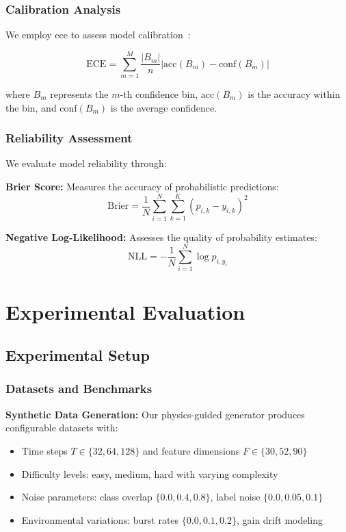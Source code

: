 \documentclass[journal]{IEEEtran}
\begin{document}
\subsubsection{Calibration Analysis}

We employ \gls{ece} to assess model calibration~\cite{calibration_guo2017}:

\begin{equation}
\text{ECE} = \sum_{m=1}^{M} \frac{|B_m|}{n} |\text{acc}(B_m) - \text{conf}(B_m)|
\end{equation}

where $B_m$ represents the $m$-th confidence bin, $\text{acc}(B_m)$ is the accuracy within the bin, and $\text{conf}(B_m)$ is the average confidence.

\subsubsection{Reliability Assessment}

We evaluate model reliability through:

\textbf{Brier Score:} Measures the accuracy of probabilistic predictions:
\begin{equation}
\text{Brier} = \frac{1}{N} \sum_{i=1}^{N} \sum_{k=1}^{K} (p_{i,k} - y_{i,k})^2
\end{equation}

\textbf{Negative Log-Likelihood:} Assesses the quality of probability estimates:
\begin{equation}
\text{NLL} = -\frac{1}{N} \sum_{i=1}^{N} \log p_{i,y_i}
\end{equation}

\section{Experimental Evaluation}

\subsection{Experimental Setup}

\subsubsection{Datasets and Benchmarks}

\textbf{Synthetic Data Generation:} Our physics-guided generator produces configurable datasets with:
\begin{itemize}
\item Time steps $T \in \{32, 64, 128\}$ and feature dimensions $F \in \{30, 52, 90\}$
\item Difficulty levels: easy, medium, hard with varying complexity
\item Noise parameters: class overlap $\{0.0, 0.4, 0.8\}$, label noise $\{0.0, 0.05, 0.1\}$
\item Environmental variations: burst rates $\{0.0, 0.1, 0.2\}$, gain drift modeling
\end{itemize}
\end{document}
